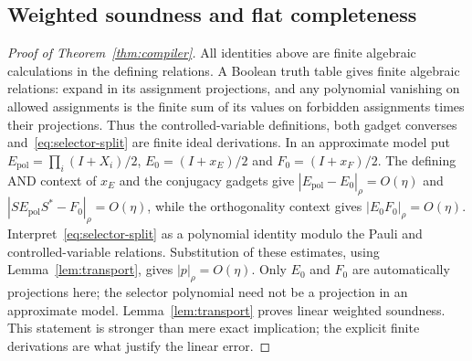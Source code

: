 \subsection{Weighted soundness and flat completeness}
\begin{proof}[Proof of Theorem~\ref{thm:compiler}]
All identities above are finite algebraic calculations in the defining relations. A Boolean truth table gives finite algebraic relations: expand in its assignment projections, and any polynomial vanishing on allowed assignments is the finite sum of its values on forbidden assignments times their projections. Thus the controlled-variable definitions, both gadget converses and~\eqref{eq:selector-split} are finite ideal derivations. In an approximate model put $E_{\mathrm{pol}}=\prod_i(I+X_i)/2$, $E_0=(I+x_E)/2$ and $F_0=(I+x_F)/2$. The defining AND context of $x_E$ and the conjugacy gadgets give $|E_{\mathrm{pol}}-E_0|_\rho=O(\eta)$ and $|SE_{\mathrm{pol}}S^*-F_0|_\rho=O(\eta)$, while the orthogonality context gives $|E_0F_0|_\rho=O(\eta)$. Interpret~\eqref{eq:selector-split} as a polynomial identity modulo the Pauli and controlled-variable relations. Substitution of these estimates, using Lemma~\ref{lem:transport}, gives $|p|_\rho=O(\eta)$. Only $E_0$ and $F_0$ are automatically projections here; the selector polynomial need not be a projection in an approximate model. Lemma~\ref{lem:transport} proves linear weighted soundness. This statement is stronger than mere exact implication; the explicit finite derivations are what justify the linear error.


\end{proof}
